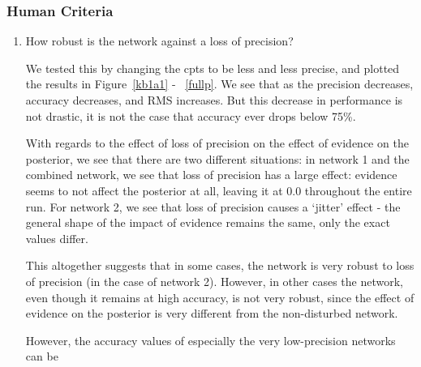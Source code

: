 \subsubsection{Human Criteria}
\begin{enumerate}


\item How robust is the network against a loss of precision?

We tested this by changing the cpts to be less and less precise, and plotted the results in Figure~\ref{kb1a1} - ~\ref{fullp}. We see that as the precision decreases, accuracy decreases, and RMS increases. But this decrease in performance is not drastic, it is not the case that accuracy ever drops below 75\%. 

With regards to the effect of loss of precision on the effect of evidence on the posterior, we see that there are two different situations: in network 1 and the combined network, we see that loss of precision has a large effect: evidence seems to not affect the posterior at all, leaving it at 0.0 throughout the entire run. For network 2, we see that loss of precision causes a `jitter' effect - the general shape of the impact of evidence remains the same, only the exact values differ.

This altogether suggests that in some cases, the network is very robust to loss of precision (in the case of network 2). However, in other cases the network, even though it remains at high accuracy, is not very robust, since the effect of evidence on the posterior is very different from the non-disturbed network.

However, the accuracy values of especially the very low-precision networks can be 



\end{enumerate}
